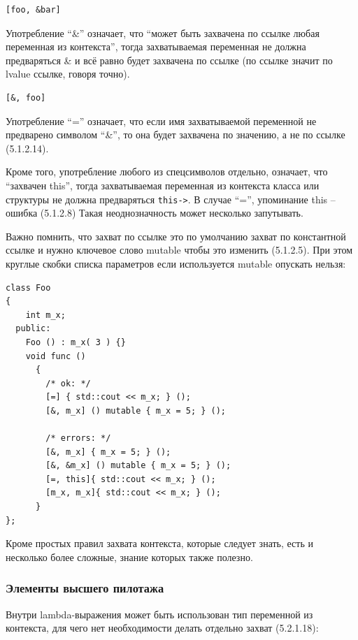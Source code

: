 \documentclass[a4paper,12pt,oneside]{article}
\begin{document}
\begin{lstlisting}
[foo, &bar]
\end{lstlisting}

Употребление ``\&'' означает, что ``может быть захвачена по ссылке любая переменная из контекста'', тогда захватываемая переменная не должна предваряться \& и всё равно будет захвачена по ссылке (по ссылке значит по lvalue ссылке, говоря точно).

\begin{lstlisting}
[&, foo]
\end{lstlisting}

Употребление ``='' означает, что если имя захватываемой переменной не предварено символом ``\&'', то она будет захвачена по значению, а не по ссылке (5.1.2.14). 

Кроме того, употребление любого из спецсимволов отдельно, означает, что ``захвачен this'', тогда захватываемая переменная из контекста класса или структуры не должна предваряться \lstinline!this->!. В случае ``='', упоминание this -- ошибка (5.1.2.8)  Такая неоднозначность может несколько запутывать.

Важно помнить, что захват по ссылке это по умолчанию захват по константной ссылке и нужно ключевое слово mutable чтобы это изменить (5.1.2.5). При этом круглые скобки списка параметров если используется mutable опускать нельзя:

\begin{lstlisting}
class Foo
{
    int m_x;
  public:
    Foo () : m_x( 3 ) {}
    void func ()
      {
        /* ok: */
        [=] { std::cout << m_x; } ();
        [&, m_x] () mutable { m_x = 5; } ();

        /* errors: */
        [&, m_x] { m_x = 5; } ();
        [&, &m_x] () mutable { m_x = 5; } ();
        [=, this]{ std::cout << m_x; } ();
        [m_x, m_x]{ std::cout << m_x; } ();
      }
};
\end{lstlisting}

Кроме простых правил захвата контекста, которые следует знать, есть и несколько более сложные, знание которых также полезно.

\subsubsection{Элементы высшего пилотажа}

Внутри lambda-выражения может быть использован тип переменной из контекста, для чего нет необходимости делать отдельно захват (5.2.1.18):
\end{document}
